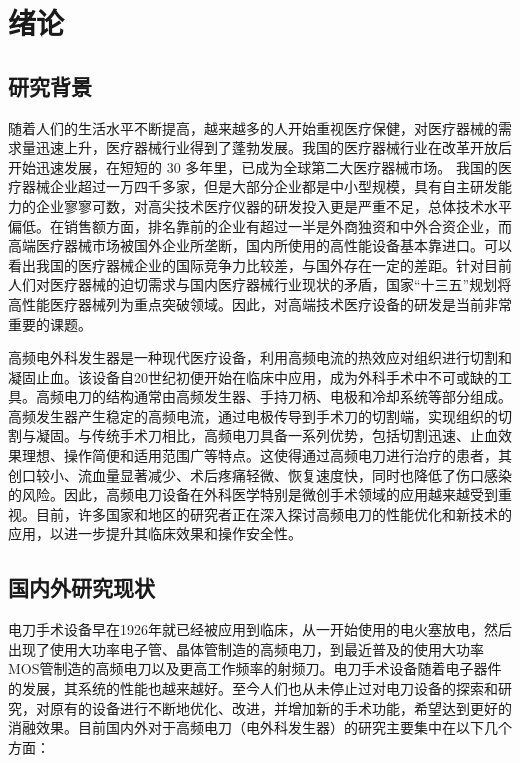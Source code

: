 \chapter{绪论}
\section{研究背景}
随着人们的生活水平不断提高，越来越多的人开始重视医疗保健，对医疗器械的需求量迅速上升，医疗器械行业得到了蓬勃发展。我国的医疗器械行业在改革开放后开始迅速发展，在短短的 30 多年里，已成为全球第二大医疗器械市场。
我国的医疗器械企业超过一万四千多家，但是大部分企业都是中小型规模，具有自主研发能力的企业寥寥可数，对高尖技术医疗仪器的研发投入更是严重不足，总体技术水平偏低。在销售额方面，排名靠前的企业有超过一半是外商独资和中外合资企业，而高端医疗器械市场被国外企业所垄断，国内所使用的高性能设备基本靠进口。可以看出我国的医疗器械企业的国际竞争力比较差，与国外存在一定的差距。针对目前人们对医疗器械的迫切需求与国内医疗器械行业现状的矛盾，国家“十三五”规划将高性能医疗器械列为重点突破领域。因此，对高端技术医疗设备的研发是当前非常重要的课题。

高频电外科发生器是一种现代医疗设备，利用高频电流的热效应对组织进行切割和凝固止血。该设备自20世纪初便开始在临床中应用，成为外科手术中不可或缺的工具。高频电刀的结构通常由高频发生器、手持刀柄、电极和冷却系统等部分组成。高频发生器产生稳定的高频电流，通过电极传导到手术刀的切割端，实现组织的切割与凝固。与传统手术刀相比，高频电刀具备一系列优势，包括切割迅速、止血效果理想、操作简便和适用范围广等特点。这使得通过高频电刀进行治疗的患者，其创口较小、流血量显著减少、术后疼痛轻微、恢复速度快，同时也降低了伤口感染的风险。因此，高频电刀设备在外科医学特别是微创手术领域的应用越来越受到重视。目前，许多国家和地区的研究者正在深入探讨高频电刀的性能优化和新技术的应用，以进一步提升其临床效果和操作安全性。
\section{国内外研究现状}
电刀手术设备早在1926年就已经被应用到临床，从一开始使用的电火塞放电，然后出现了使用大功率电子管、晶体管制造的高频电刀，到最近普及的使用大功率MOS管制造的高频电刀以及更高工作频率的射频刀。电刀手术设备随着电子器件的发展，其系统的性能也越来越好。至今人们也从未停止过对电刀设备的探索和研究，对原有的设备进行不断地优化、改进，并增加新的手术功能，希望达到更好的消融效果。目前国内外对于高频电刀（电外科发生器）的研究主要集中在以下几个方面：

